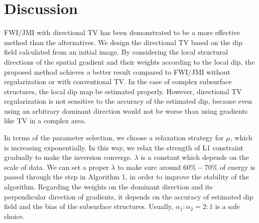 \section{Discussion}
FWI/JMI with directional TV has been demonstrated to be a more effective method than the alternatives. We design the directional TV based on the dip field calculated from an initial image. By considering the local structural directions of the spatial gradient and their weights according to the local dip, the proposed method achieves a better result compared to FWI/JMI without regularization or with conventional TV. In the case of complex subsurface structures, the local dip map  be estimated properly. However, directional TV regularization is not sensitive to the accuracy of the estimated dip, because even using an arbitrary dominant direction would not be worse than using gradients like  TV in a complex area.

In terms of the parameter selection, we choose a relaxation strategy for $\mu$, which is increasing exponentially. In this way, we relax the strength of  L1 constraint gradually to make the inversion converge. $\lambda$ is a constant which depends on the scale of  data. We can set a proper $\lambda$ to make sure around $60\% - 70\%$ of  energy is passed through the  step in Algorithm 1, in order to improve the stability of the algorithm. Regarding the weights on the dominant direction and its perpendicular direction of gradients, it depends on the accuracy of  estimated dip field and the bias of the subsurface structures. Usually, $\alpha_1 : \alpha_2 = 2 : 1$ is a safe choice. 


